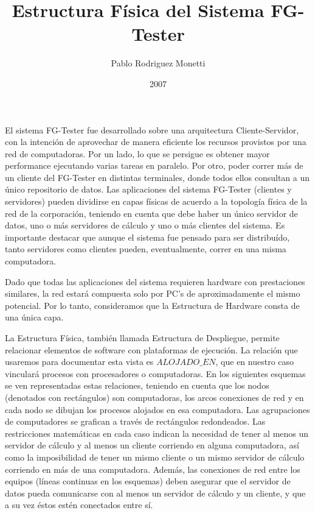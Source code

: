 \documentclass[a4paper,11pt]{article}
\author{Pablo Rodriguez Monetti}
\title{Estructura Física del Sistema FG-Tester}
\date{2007}
\begin{document}
 \maketitle
\paragraph{}
El sistema FG-Tester fue desarrollado sobre una arquitectura Cliente-Servidor, con la intención de aprovechar de manera eficiente los recursos provistos por una red de computadoras. Por un lado, lo que se persigue es obtener mayor performance ejecutando varias tareas en paralelo. Por otro, poder correr más de un cliente del FG-Tester en distintas terminales, donde todos ellos consultan a un único repositorio de datos.
Las aplicaciones del sistema FG-Tester (clientes y servidores) pueden dividirse en capas físicas de acuerdo a la topología física de la red de la corporación, teniendo en cuenta que debe haber un único servidor de datos, uno o más servidores de cálculo y uno o más clientes del sistema. Es importante destacar que aunque el sistema fue pensado para ser distribuído, tanto servidores como clientes pueden, eventualmente, correr en una misma computadora.

Dado que todas las aplicaciones del sistema requieren hardware con prestaciones similares, la red estará compuesta solo por PC's de aproximadamente el mismo potencial. Por lo tanto, consideramos que la Estructura de Hardware consta de una única capa.

La Estructura Física, también llamada Estructura de Despliegue, permite relacionar elementos de software con plataformas de ejecución. La relación que usaremos para documentar esta vista es $ALOJADO\_EN$, que en nuestro caso vinculará procesos con procesadores o computadoras. En los siguientes esquemas se ven representadas estas relaciones, teniendo en cuenta que los nodos (denotados con rectángulos) son computadoras, los arcos conexiones de red y en cada nodo se dibujan los procesos alojados en esa computadora. Las agrupaciones de computadores se grafican a través de rectángulos redondeados. Las restricciones matemáticas en cada caso indican la necesidad de tener al menos un servidor de cálculo y al menos un cliente corriendo en alguna computadora, así como la imposibilidad de tener un mismo cliente o un mismo servidor de cálculo corriendo en más de una computadora. Además, las conexiones de red entre los equipos (líneas continuas en los esquemas) deben asegurar que el servidor de datos pueda comunicarse con al menos un servidor de cálculo y un cliente, y que a su vez éstos estén conectados entre sí.
\end{document}
